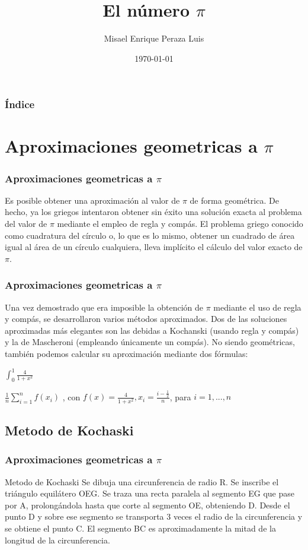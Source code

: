 \documentclass{beamer}
\title[\bf{El número $\pi$}]{El número $\pi$}
\author[Misael Enrique Peraza Luis]{Misael Enrique Peraza Luis}
\date[\today]{\today}
\begin{document}
\begin{frame}
\titlepage
\end{frame}

\begin{frame}
\frametitle{Índice}
\tableofcontents[pausesections]
\end{frame}


\section {Aproximaciones geometricas a $\pi$}
\begin{frame}
\frametitle{Aproximaciones geometricas a $\pi$}
Es posible obtener una aproximación al valor de $\pi$ de forma geométrica. De hecho, ya los griegos intentaron obtener sin éxito una solución exacta al problema del valor de $\pi$ mediante el empleo de regla y compás. El problema griego conocido como cuadratura del círculo o, lo que es lo mismo, obtener un cuadrado de área igual al área de un círculo cualquiera, lleva implícito el cálculo del valor exacto de $\pi$.
\end{frame}



\begin{frame}
\frametitle{Aproximaciones geometricas a $\pi$}
Una vez demostrado que era imposible la obtención de $\pi$ mediante el uso de regla y compás, se desarrollaron varios métodos aproximados. Dos de las soluciones aproximadas más elegantes son las debidas a Kochanski (usando regla y compás) y la de Mascheroni (empleando únicamente un compás).
No siendo geométricas, también podemos calcular su aproximación mediante dos fórmulas:

$\int_{0}^{1}\frac{4}{1+x^2}$

$\frac{1}{n} \sum_{i=1}^{n} f(x_i)$ , con  $f(x) = \frac{4}{1+x^2} , x_i = \frac{i-\frac{1}{2}}{n}$, para $i=1,...,n$

\end{frame}
\subsection {Metodo de Kochaski}
\begin{frame}
\frametitle{Aproximaciones geometricas a $\pi$}
\begin{block}{Metodo de Kochaski}
Se dibuja una circunferencia de radio R. Se inscribe el triángulo equilátero OEG. Se traza una recta paralela al segmento EG que pase por A, prolongándola hasta que corte al segmento OE, obteniendo D. Desde el punto D y sobre ese segmento se transporta 3 veces el radio de la circunferencia y se obtiene el punto C. El segmento BC es aproximadamente la mitad de la longitud de la circunferencia. \cite{Wpress}
\end{block}
\end{frame}
\end{document}
